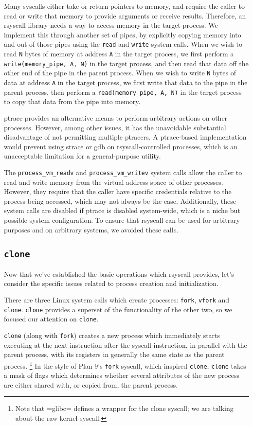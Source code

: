 \documentclass{acmart}
\begin{document}
Many syscalls either take or return pointers to memory,
and require the caller to read or write that memory to provide arguments or receive results.
Therefore, an rsyscall library needs a way to access memory in the target process.
We implement this through another set of pipes,
by explicitly copying memory into and out of those pipes using the \texttt{read} and \texttt{write} system calls.
When we wish to read \texttt{N} bytes of memory at address \texttt{A} in the target process,
we first perform a \verb|write(memory_pipe, A, N)| in the target process,
and then read that data off the other end of the pipe in the parent process.
When we wish to write \texttt{N} bytes of data at address \texttt{A} in the target process,
we first write that data to the pipe in the parent process,
then perform a \verb|read(memory_pipe, A, N)| in the target process to copy that data from the pipe into memory.

ptrace provides an alternative means to perform arbitrary actions on other processes.
However, among other issues, it has the unavoidable substantial disadvantage of not permitting multiple ptracers.
A ptrace-based implementation would prevent using strace or gdb on rsyscall-controlled processes,
which is an unacceptable limitation for a general-purpose utility.

The \verb|process_vm_readv| and \verb|process_vm_writev| system calls
allow the caller to read and write memory from the virtual address space of other processes.
However, they require that the caller have specific credentials relative to the process being accessed,
which may not always be the case.
Additionally, these system calls are disabled if ptrace is disabled system-wide,
which is a niche but possible system configuration.
To ensure that rsyscall can be used for arbitrary purposes and on arbitrary systems, we avoided these calls.
\subsection{\texttt{clone}}\label{clone}
Now that we've established the basic operations which rsyscall provides,
let's consider the specific issues related to process creation and initialization.

There are three Linux system calls which create processes:
\texttt{fork}, \texttt{vfork} and \texttt{clone}.
\texttt{clone} provides a superset of the functionality of the other two,
so we focused our attention on \texttt{clone}.

\texttt{clone} (along with \texttt{fork}) creates a new process
which immediately starts executing at the next instruction after the syscall instruction,
in parallel with the parent process,
with its registers in generally the same state as the parent process.
\footnote{Note that =glibc= defines a wrapper for the clone syscall;
we are talking about the raw kernel syscall.}
In the style of Plan 9's \texttt{fork} syscall\cite{rfork}, which inspired \texttt{clone},
\texttt{clone} takes a mask of flags which determines whether several attributes of the new process
are either shared with, or copied from, the parent process.
\end{document}
